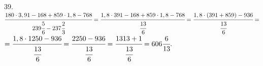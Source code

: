 39. $\cfrac{180\cdot3,91-168+859\cdot1,8-768}{239\cfrac{5}{6}-237\cfrac{2}{3}}=
\cfrac{1,8\cdot391-168+859\cdot1,8-768}{\cfrac{13}{6}}=\cfrac{1,8\cdot(391+859)-936}{\cfrac{13}{6}}=$\\$=\cfrac{1,8\cdot1250-936}{\cfrac{13}{6}}=
\cfrac{2250-936}{\cfrac{13}{6}}=\cfrac{1313+1}{\cfrac{13}{6}}=606\cfrac{6}{13}.$\\
